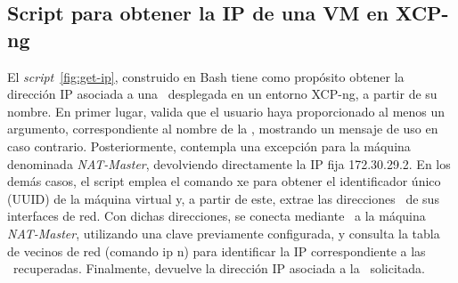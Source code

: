 \subsection{Script para obtener la IP de una VM en XCP-ng}
\noindent
El \textit{script}~\ref{fig:get-ip}, construido en Bash tiene como propósito obtener la dirección IP asociada a una \VM\ desplegada en un entorno XCP-ng, a partir de su nombre. En primer lugar, valida que el usuario haya proporcionado al menos un argumento, correspondiente al nombre de la \VM, mostrando un mensaje de uso en caso contrario. Posteriormente, contempla una excepción para la máquina denominada \textit{NAT-Master}, devolviendo directamente la IP fija 172.30.29.2. En los demás casos, el script emplea el comando xe para obtener el identificador único (UUID) de la máquina virtual y, a partir de este, extrae las direcciones \MAC\ de sus interfaces de red. Con dichas direcciones, se conecta mediante \SSH\ a la máquina \textit{NAT-Master}, utilizando una clave previamente configurada, y consulta la tabla de vecinos de red (comando ip n) para identificar la IP correspondiente a las \MAC\ recuperadas. Finalmente, devuelve la dirección IP asociada a la \VM\ solicitada.

